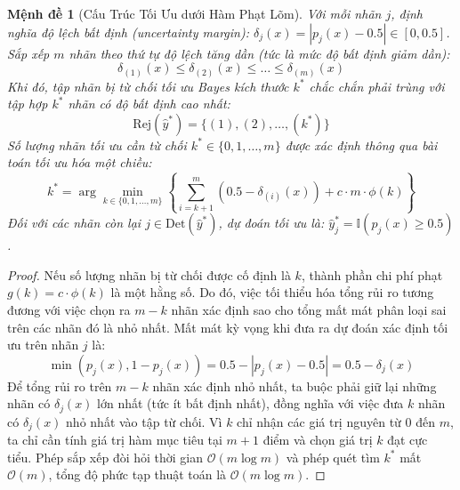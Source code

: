 \documentclass[11pt,a4paper]{article}
\newtheorem{proposition}{Mệnh đề}[section]
\begin{document}
\begin{proposition}[Cấu Trúc Tối Ưu dưới Hàm Phạt Lõm]
\label{prop:bop_concave}
Với mỗi nhãn $j$, định nghĩa độ lệch bất định (uncertainty margin): $\delta_j(x) = |p_j(x) - 0.5| \in [0, 0.5]$. Sắp xếp $m$ nhãn theo thứ tự độ lệch tăng dần (tức là mức độ bất định giảm dần):
\begin{equation}
\delta_{(1)}(x) \le \delta_{(2)}(x) \le \dots \le \delta_{(m)}(x)
\end{equation}
Khi đó, tập nhãn bị từ chối tối ưu Bayes kích thước $k^*$ chắc chắn phải trùng với tập hợp $k^*$ nhãn có độ bất định cao nhất:
\begin{equation}
\mathrm{Rej}(\hat{y}^*) = \{(1), (2), \dots, (k^*)\}
\end{equation}
Số lượng nhãn tối ưu cần từ chối $k^* \in \{0, 1, \dots, m\}$ được xác định thông qua bài toán tối ưu hóa một chiều:
\begin{equation}
k^* = \arg\min_{k \in \{0, 1, \dots, m\}} \left\{ \sum_{i=k+1}^m \left( 0.5 - \delta_{(i)}(x) \right) + c \cdot m \cdot \phi(k) \right\}
\label{eq:optimal_k_search}
\end{equation}
Đối với các nhãn còn lại $j \in \mathrm{Det}(\hat{y}^*)$, dự đoán tối ưu là: $\hat{y}_j^* = \mathbb{I}(p_j(x) \ge 0.5)$.
\end{proposition}

\begin{proof}
Nếu số lượng nhãn bị từ chối được cố định là $k$, thành phần chi phí phạt $g(k) = c \cdot \phi(k)$ là một hằng số. Do đó, việc tối thiểu hóa tổng rủi ro tương đương với việc chọn ra $m - k$ nhãn xác định sao cho tổng mất mát phân loại sai trên các nhãn đó là nhỏ nhất. Mất mát kỳ vọng khi đưa ra dự đoán xác định tối ưu trên nhãn $j$ là:
\begin{equation}
\min(p_j(x), 1 - p_j(x)) = 0.5 - |p_j(x) - 0.5| = 0.5 - \delta_j(x)
\end{equation}
Để tổng rủi ro trên $m - k$ nhãn xác định nhỏ nhất, ta buộc phải giữ lại những nhãn có $\delta_j(x)$ lớn nhất (tức ít bất định nhất), đồng nghĩa với việc đưa $k$ nhãn có $\delta_j(x)$ nhỏ nhất vào tập từ chối. Vì $k$ chỉ nhận các giá trị nguyên từ $0$ đến $m$, ta chỉ cần tính giá trị hàm mục tiêu tại $m + 1$ điểm và chọn giá trị $k$ đạt cực tiểu. Phép sắp xếp đòi hỏi thời gian $\mathcal{O}(m \log m)$ và phép quét tìm $k^*$ mất $\mathcal{O}(m)$, tổng độ phức tạp thuật toán là $\mathcal{O}(m \log m)$.
\end{proof}
\end{document}
